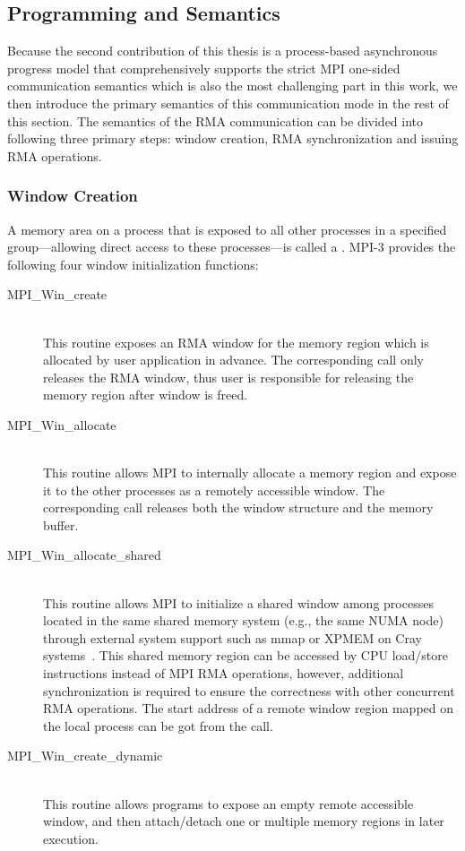 \subsection{Programming and Semantics}

Because the second contribution of this thesis is a process-based asynchronous
progress model that comprehensively supports the strict MPI one-sided
communication semantics which is also the most challenging part in this work,
we then introduce the primary semantics of this communication mode in the rest
of this section. The semantics of the RMA communication can be divided into
following three primary steps: window creation, RMA synchronization and
issuing RMA operations.


\subsubsection{Window Creation}

A memory area on a process that is exposed to all other processes in a
specified group---allowing direct access to these processes---is called
a . MPI-3 provides the following four window initialization
functions:

\begin{description}
\item[MPI\_Win\_create]\hfill \\
This routine exposes an RMA window for the memory region which is allocated
by user application in advance. The corresponding 
call only releases the RMA window, thus user is responsible for releasing
the memory region after window is freed.

\item[MPI\_Win\_allocate]\hfill \\
This routine allows MPI to internally allocate a memory region and expose
it to the other processes as a remotely accessible window. The corresponding
 call releases both the window structure and the memory
buffer.

\item[MPI\_Win\_allocate\_shared]\hfill \\
This routine allows MPI to initialize a shared window among processes
located in the same shared memory system (e.g., the same NUMA node) through
external system support such as mmap or XPMEM on Cray systems~\cite{xpmem}.
This shared memory region can be accessed by CPU load\slash store instructions
instead of MPI RMA operations, however, additional synchronization is required
to ensure the correctness with other concurrent RMA operations. The start
address of a remote window region mapped on the local process can be got from
the  call.

\item[MPI\_Win\_create\_dynamic]\hfill \\
This routine allows programs to expose an empty remote accessible window,
and then attach\slash detach one or multiple memory regions in later execution.
\end{description}


